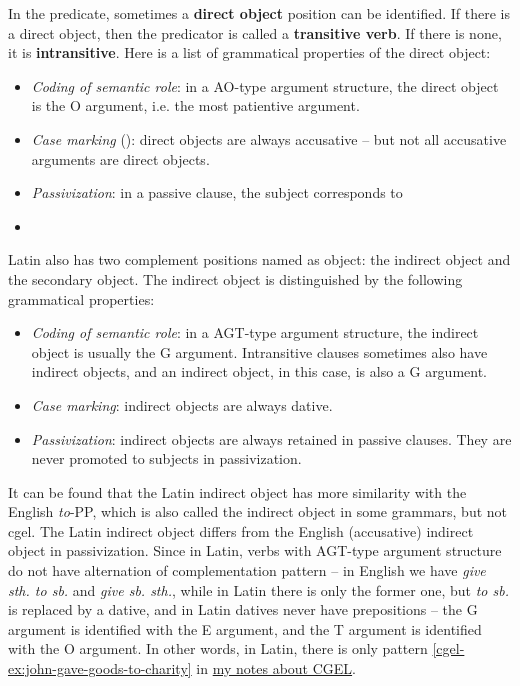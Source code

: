 \documentclass{article}
\newcommand*{\concept}[1]{\textbf{#1}}
\newcommand*{\corpus}[1]{\emph{#1}}
\newcommand{\cgel}{\href{../English/cambridge.pdf}{my notes about CGEL}}
\begin{document}
In the predicate, sometimes a \concept{direct object} position can be identified.
If there is a direct object, then the predicator is called a \concept{transitive verb}.
If there is none, it is \concept{intransitive}.
Here is a list of grammatical properties of the direct object:
\begin{itemize}
    \item \emph{Coding of semantic role}: in a AO-type argument structure, 
    the direct object is the O argument, i.e. the most patientive argument. 

    \item \emph{Case marking} (): direct objects are always accusative -- 
    but not all accusative arguments are direct objects.
    \item \emph{Passivization}: in a passive clause, the subject corresponds to 
    \item %
\end{itemize}

Latin also has two complement positions named as object:
the indirect object and the secondary object.
The indirect object is distinguished by the following grammatical properties:
\begin{itemize}
    \item \emph{Coding of semantic role}: in a AGT-type argument structure, 
    the indirect object is usually the G argument.
    Intransitive clauses sometimes also have indirect objects, 
    and an indirect object, in this case, is also a G argument.
    \item \emph{Case marking}: indirect objects are always dative.
    \item \emph{Passivization}: indirect objects are always retained in passive clauses. 
    They are never promoted to subjects in passivization.
\end{itemize}
It can be found that the Latin indirect object has more similarity with the English \corpus{to}-PP,
which is also called the indirect object in some grammars, but not \ac{cgel}.
The Latin indirect object differs from the English (accusative) indirect object in passivization.
Since in Latin, verbs with AGT-type argument structure do not have alternation of complementation pattern
-- in English we have \corpus{give sth. to sb.} and \corpus{give sb. sth.}, 
while in Latin there is only the former one, but \corpus{to sb.} is replaced by a dative,
and in Latin datives never have prepositions --
the G argument is identified with the E argument,
and the T argument is identified with the O argument.
In other words, in Latin, there is only pattern \eqref{cgel-ex:john-gave-goods-to-charity} in \cgel.
\end{document}
